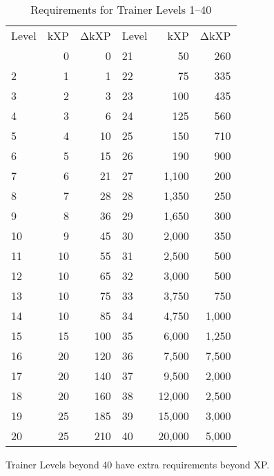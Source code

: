 \begin{table}[ht]
\begin{center}
\begin{tabular}{l r r l r r}
  Level & kXP & ΔkXP & Level & kXP & ΔkXP \\
\Midrule
1 & 0 & 0 & 21 & 50 & 260 \\
2 & 1 & 1 & 22 & 75 & 335 \\
3 & 2 & 3 & 23 & 100 & 435 \\
4 & 3 & 6 & 24 & 125 & 560 \\
5 & 4 & 10 & 25 & 150 & 710 \\
6 & 5 & 15 & 26 & 190 & 900 \\
7 & 6 & 21 & 27 & 1,100 & 200 \\
8 & 7 & 28 & 28 & 1,350 & 250 \\
9 & 8 & 36 & 29 & 1,650 & 300 \\
10 & 9 & 45 & 30 & 2,000 & 350 \\
11 & 10 & 55 & 31 & 2,500 & 500 \\
12 & 10 & 65 & 32 & 3,000 & 500 \\
13 & 10 & 75 & 33 & 3,750 & 750 \\
14 & 10 & 85 & 34 & 4,750 & 1,000 \\
15 & 15 & 100 & 35 & 6,000 & 1,250 \\
16 & 20 & 120 & 36 & 7,500 & 7,500 \\
17 & 20 & 140 & 37 & 9,500 & 2,000 \\
18 & 20 & 160 & 38 & 12,000 & 2,500 \\
19 & 25 & 185 & 39 & 15,000 & 3,000 \\
20 & 25 & 210 & 40 & 20,000 & 5,000 \\
\end{tabular}
\caption{Requirements for Trainer Levels 1--40}
\end{center}
\end{table}

Trainer Levels beyond 40 have extra requirements beyond XP.

